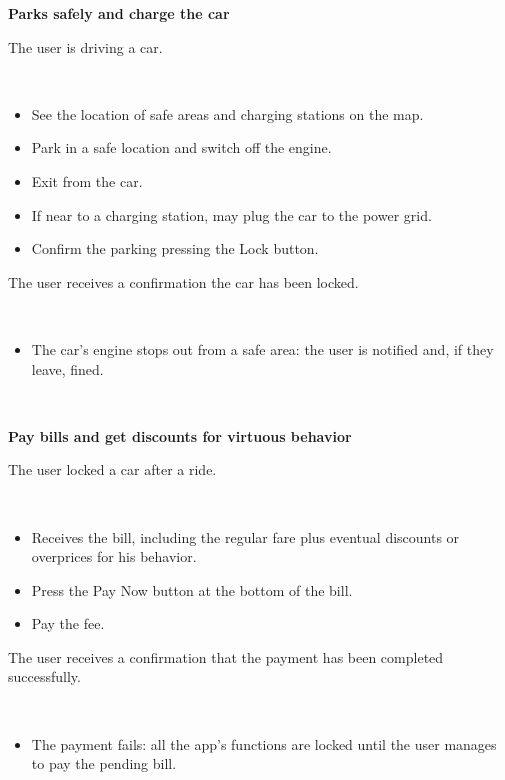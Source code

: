 \documentclass[11pt]{article} %
\begin{document}
\begin{description}[noitemsep,topsep=0pt,parsep=0pt,partopsep=0pt]
	\item[Name:] \textbf{Parks safely and charge the car}
	\item[Entry Conditions:] The user is driving a car.
	\item[Flow Of Events:] \hfill\
	\begin{itemize}
		\item See the location of safe areas and charging stations on the map.
		\item Park in a safe location and switch off the engine.
		\item Exit from the car.
		\item If near to a charging station, may plug the car to the power grid.
		\item Confirm the parking pressing the Lock button.
	\end{itemize}
	\item[Exit conditions:]  The user receives a confirmation the car has been locked.
	\item[Exceptions:] \hfill\
	\begin{itemize}
		\item The car's engine stops out from a safe area: the user is notified and, if they leave, fined.
	\end{itemize}
\end{description}
\hfill\

\begin{description}[noitemsep,topsep=0pt,parsep=0pt,partopsep=0pt]
	\item[Name:] \textbf{Pay bills and get discounts for virtuous behavior}
	\item[Entry Conditions:] The user locked a car after a ride.
	\item[Flow Of Events:] \hfill\
	\begin{itemize}
		\item Receives the bill, including the regular fare plus eventual discounts or overprices for his behavior.
		\item Press the Pay Now button at the bottom of the bill.
		\item Pay the fee.
	\end{itemize}
	\item[Exit conditions:]  The user receives a confirmation that the payment has been completed successfully.
	\item[Exceptions:] \hfill\
	\begin{itemize}
		\item The payment fails: all the app's functions are locked until the user manages to pay the pending bill.
	\end{itemize}
\end{description}
\hfill\
\end{document}

